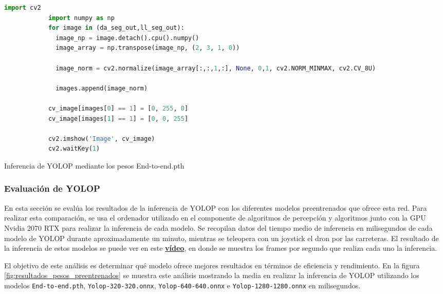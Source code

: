         \begin{code}[H]
          \begin{lstlisting}[language=Python]
            import cv2
            import numpy as np
            for image in (da_seg_out,ll_seg_out):
              image_np = image.detach().cpu().numpy()
              image_array = np.transpose(image_np, (2, 3, 1, 0))
    
              image_norm = cv2.normalize(image_array[:,:,1,:], None, 0,1, cv2.NORM_MINMAX, cv2.CV_8U)
    
              images.append(image_norm)
    
            cv_image[images[0] == 1] = [0, 255, 0]
            cv_image[images[1] == 1] = [0, 0, 255]
    
            cv2.imshow('Image', cv_image)
            cv2.waitKey(1)
          \end{lstlisting}
          \caption[Resultado de la inferencia del modelo YOLOP]{Inferencia de YOLOP mediante los pesos End-to-end.pth}
          \label{cod:Resultadoinferencia}
          \end{code}  


\subsubsection{Evaluación de YOLOP }
\label{sec:resultados}
En esta sección se evalúa los resultados de la inferencia de YOLOP con los diferentes modelos preentrenados que ofrece esta red. Para realizar esta comparación, se usa el ordenador utilizado 
en el componente de algoritmos de percepción y algoritmos junto con la GPU Nvidia 2070 RTX para realizar la inferencia de cada modelo. Se recopilan datos del tiempo medio de inferencia en milisegundos de cada 
modelo de YOLOP durante aproximadamente
un minuto, mientras se teleopera con un joystick el dron por las carreteras. El resultado de la inferencia de estos modelos se puede ver en este \href{https://youtu.be/8s3RBu_L3oE?si=iJM_OqKiDvtyfBvv}{\textbf{vídeo}}, 
en donde se muestra los frames por segundo que realiza cada uno la inferencia.

El objetivo de este análisis es determinar qué modelo ofrece mejores resultados en términos de eficiencia y rendimiento. 
En la figura \ref{fig:resultados_pesos_preentrenados} se muestra este análisis mostrando la media en realizar la inferencia de YOLOP utilizando los modelos 
\texttt{End-to-end.pth}, \texttt{Yolop-320-320.onnx}, \texttt{Yolop-640-640.onnx} e \texttt{Yolop-1280-1280.onnx} en milisegundos.

